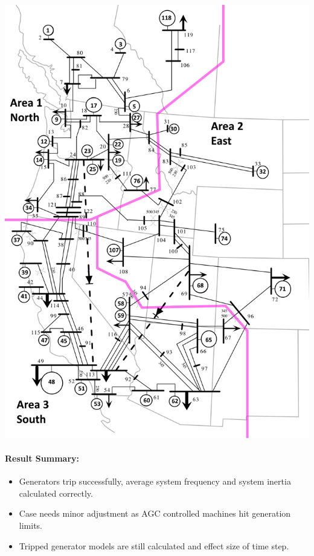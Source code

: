 \documentclass[12pt]{article}
\begin{document}
\begin{minipage}{0.47\linewidth}
\includegraphics[width=\linewidth]{miniWECC_split03.png}
\end{minipage}%

\paragraph{Result Summary:}
\begin{itemize}
\item Generators trip successfully, average system frequency and system inertia calculated correctly.
\item Case needs minor adjustment as AGC controlled machines hit generation limits.
\item Tripped generator models are still calculated and effect size of time step.
\end{itemize}
\end{document}

